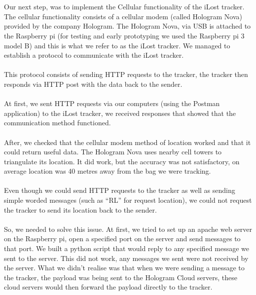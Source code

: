 \documentclass[12pt,a4paper]{article}
\begin{document}
        
        \paragraph{} Our next step, was to implement the Cellular functionality of the iLost tracker. The cellular functionality consists of a cellular modem (called Hologram Nova) provided by the company Hologram. The Hologram Nova, via USB is attached to the Raspberry pi (for testing and early prototyping we used the Raspberry pi 3 model B) and this is what we refer to as the iLost tracker. We managed to establish a protocol to communicate with the iLost tracker.
        
        \paragraph{} This protocol consists of sending HTTP requests to the tracker, the tracker then responds via HTTP post with the data back to the sender.   
        
        \paragraph{} At first, we sent HTTP requests via our computers (using the Postman application) to the iLost tracker, we received responses that showed that the communication method functioned. 
        
        \paragraph{} After, we checked that the cellular modem method of location worked and that it could return useful data. The Hologram Nova uses nearby cell towers to triangulate its location. It did work, but the accuracy was not satisfactory, on average location was 40 metres away from the bag we were tracking.
        
        \paragraph{} Even though we could send HTTP requests to the tracker as well as sending simple worded messages (such as “RL” for request location), we could not request the tracker to send its location back to the sender.
        
        \paragraph{} So, we needed to solve this issue. At first, we tried to set up an apache web server on the Raspberry pi, open a specified port on the server and send messages to that port. We built a python script that would reply to any specified message we sent to the server. This did not work, any messages we sent were not received by the server. What we didn’t realise was that when we were sending a message to the tracker, the payload was being sent to the Hologram Cloud servers, these cloud servers would then forward the payload directly to the tracker.
        
\end{document}
